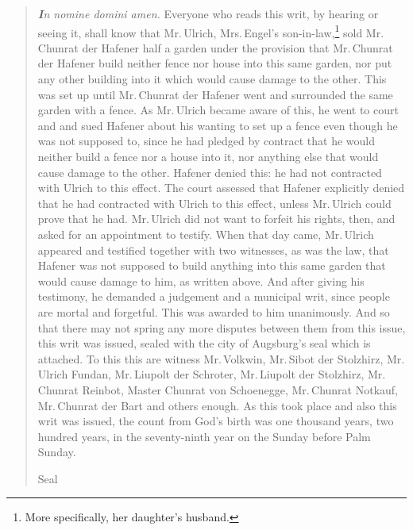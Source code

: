 \documentclass[12pt,paper=a4]{scrartcl}
\begin{document}
\blockquote{\emph{\textbf{I}n nomine domini amen.} Everyone who reads this writ, by hearing or seeing it, shall know that Mr.\,Ulrich, Mrs.\,Engel's son-in-law,\footnote{More specifically, her daughter's husband.} sold Mr.\,Chunrat der Hafener half a garden under the provision that Mr.\,Chunrat der Hafener build neither fence nor house into this same garden, nor put any other building into it which would cause damage to the other. This was set up until Mr.\,Chunrat der Hafener went and surrounded the same garden with a fence. As Mr.\,Ulrich became aware of this, he went to court and and sued Hafener about his wanting to set up a fence even though he was not supposed to, since he had pledged by contract that he would neither build a fence nor a house into it, nor anything else that would cause damage to the other. Hafener denied this: he had not contracted with Ulrich to this effect. The court assessed that Hafener explicitly denied that he had contracted with Ulrich to this effect, unless Mr.\,Ulrich could prove that he had. Mr.\,Ulrich did not want to forfeit his rights, then, and asked for an appointment to testify. When that day came, Mr.\,Ulrich appeared and testified together with two witnesses, as was the law, that Hafener was not supposed to build anything into this same garden that would cause damage to him, as written above. And after giving his testimony, he demanded a judgement and a municipal writ, since people are mortal and forgetful. This was awarded to him unanimously. And so that there may not spring any more disputes between them from this issue, this writ was issued, sealed with the city of Augsburg's seal which is attached. To this this are witness Mr.\,Volkwin, Mr.\,Sibot der Stolzhirz, Mr.\,Ulrich Fundan, Mr.\,Liupolt der Schroter, Mr.\,Liupolt der Stolzhirz, Mr.\,Chunrat Reinbot, Master Chunrat von Schoenegge, Mr.\,Chunrat Notkauf, Mr.\,Chunrat der Bart and others enough. As this took place and also this writ was issued, the count from God's birth was one thousand years, two hundred years, in the seventy-ninth year on the Sunday before Palm Sunday.

\begin{center}
Seal
\end{center}}


\printbibliography
\end{document}
